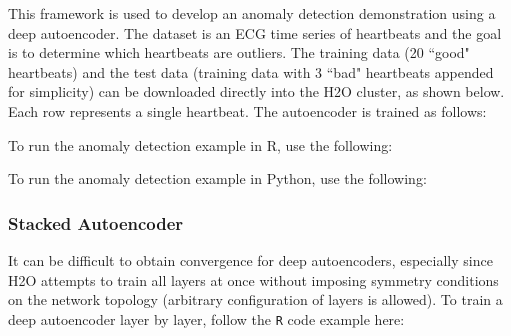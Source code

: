 {{This framework is used to develop an anomaly detection demonstration using a deep autoencoder. The dataset is an ECG time series of heartbeats and the goal is to determine which heartbeats are outliers. The training data (20 ``good" heartbeats) and the test data (training data with 3 ``bad" heartbeats appended for simplicity) can be downloaded directly into the H2O cluster, as shown below.  Each row represents a single heartbeat. The autoencoder is trained as follows: 

%
%                              
%                              
%
%
\waterExampleInR
To run the anomaly detection example in R, use the following: 


\waterExampleInPython
To run the anomaly detection example in Python, use the following: 


\noindent

\subsubsection{Stacked Autoencoder}
It can be difficult to obtain convergence for deep autoencoders, especially since H2O attempts to train all layers at once without imposing symmetry conditions on the network topology (arbitrary configuration of layers is allowed). To train a deep autoencoder layer by layer, follow the \texttt{R} code example here:

}}
